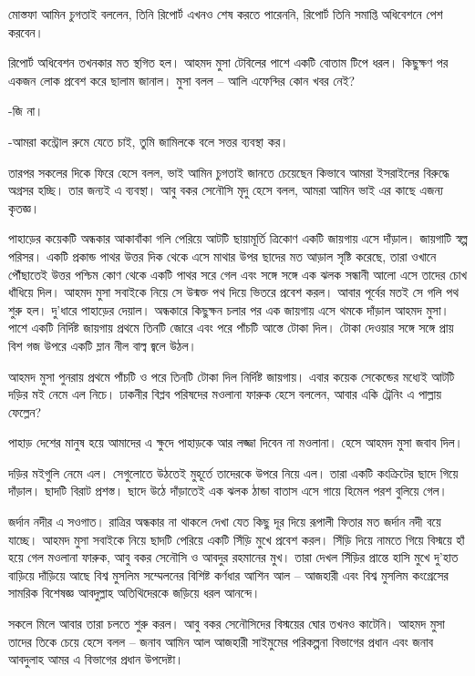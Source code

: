 \documentclass[
]{book}
\begin{document}
মোস্তফা আমিন চুগতাই বললেন, তিনি রিপোর্ট এখনও শেষ করতে পারেননি, রিপোর্ট তিনি সমাপ্তি অধিবেশনে পেশ করবেন।

রিপোর্ট অধিবেশন তখনকার মত স্থগিত হল। আহমদ মুসা টেবিলের পাশে একটি বোতাম টিপে ধরল। কিছুক্ষণ পর একজন লোক প্রবেশ করে ছালাম জানাল। মুসা বলল -- আলি এফেন্দির কোন খবর নেই?

-জি না।

-আমরা কন্ট্রোল রুমে যেতে চাই, তুমি জামিলকে বলে সত্তর ব্যবস্থা কর।

তারপর সকলের দিকে ফিরে হেসে বলল, ভাই আমিন চুগতাই জানতে চেয়েছেন কিভাবে আমরা ইসরাইলের বিরুদ্ধে অগ্রসর হচ্ছি। তার জন্যই এ ব্যবস্থা। আবু বকর সেনৌসি মৃদু হেসে বলল, আমরা আমিন ভাই এর কাছে এজন্য কৃতজ্ঞ।

পাহাড়ের কয়েকটি অন্ধকার আকাবাঁকা গলি পেরিয়ে আটটি ছায়ামূর্তি ত্রিকোণ একটি জায়গায় এসে দাঁড়াল। জায়গাটি স্বল্প পরিসর। একটি প্রকান্ড পাথর উত্তর দিক থেকে এসে মাথার উপর ছাদের মত আড়াল সৃষ্টি করেছে, তারা ওখানে পৌঁছাতেই উত্তর পশ্চিম কোণ থেকে একটি পাথর সরে গেল এবং সঙ্গে সঙ্গে এক ঝলক সন্ধানী আলো এসে তাদের চোখ ধাঁধিয়ে দিল। আহমদ মুসা সবাইকে নিয়ে সে উন্মক্ত পথ দিয়ে ভিতরে প্রবেশ করল। আবার পূর্বের মতই সে গলি পথ শুরু হল। দু'ধারে পাহাড়ের দেয়াল। অন্ধকারে কিছুক্ষন চলার পর এক জায়গায় এসে থমকে দাঁড়াল আহমদ মুসা। পাশে একটি নির্দিষ্ট জায়গায় প্রথমে তিনটি জোরে এবং পরে পাঁচটি আস্তে টোকা দিল। টোকা দেওয়ার সঙ্গে সঙ্গে প্রায় বিশ গজ উপরে একটি ম্লান নীল বাল্ব জ্বলে উঠল।

আহমদ মুসা পুনরায় প্রথমে পাঁচটি ও পরে তিনটি টোকা দিল নির্দিষ্ট জায়গায়। এবার কয়েক সেকেন্ডের মধ্যেই আটটি দড়ির মই নেমে এল নিচে। ঢাকনীর বিপ্লব পরিষদের মওলানা ফারুক হেসে বললেন, আবার একি ট্রেনিং এ পাল্লায় ফেল্লেন?

পাহাড় দেশের মানুষ হয়ে আমাদের এ ক্ষুদে পাহাড়কে আর লজ্জা দিবেন না মওলানা। হেসে আহমদ মুসা জবাব দিল।

দড়ির মইগুলি নেমে এল। সেগুলোতে উঠতেই মুহূর্তে তাদেরকে উপরে নিয়ে এল। তারা একটি কংক্রিটের ছাদে গিয়ে দাঁড়াল। ছাদটি বিরাট প্রশস্ত। ছাদে উঠে দাঁড়াতেই এক ঝলক ঠান্ডা বাতাস এসে গায়ে হিমেল পরশ বুলিয়ে গেল।

জর্দান নদীর এ সওগাত। রাত্রির অন্ধকার না থাকলে দেখা যেত কিছু দূর দিয়ে রূপালী ফিতার মত জর্দান নদী বয়ে যাচ্ছে। আহমদ মুসা সবাইকে নিয়ে ছাদটি পেরিয়ে একটি সিঁড়ি মুখে প্রবেশ করল। সিঁড়ি দিয়ে নামতে গিয়ে বিস্ময়ে হাঁ হয়ে গেল মওলানা ফারুক, আবু বকর সেনৌসি ও আবদুর রহমানের মুখ। তারা দেখল সিঁড়ির প্রান্তে হাসি মুখে দু'হাত বাড়িয়ে দাঁড়িয়ে আছে বিশ্ব মুসলিম সম্মেলনের বিশিষ্ট কর্ণধার আশিন আল -- আজহারী এবং বিশ্ব মুসলিম কংগ্রেসের সামরিক বিশেষজ্ঞ আবদুল্লাহ অতিথিদেরকে জড়িয়ে ধরল আনন্দে।

সকলে মিলে আবার তারা চলতে শুরু করল। আবু বকর সেনৌসিদের বিস্ময়ের ঘোর তখনও কাটেনি। আহমদ মুসা তাদের তিকে চেয়ে হেসে বলল -- জনাব আমিন আল আজহারী সাইমুমের পরিকল্পনা বিভাগের প্রধান এবং জনাব আবদুলাহ আমর এ বিভাগের প্রধান উপদেষ্টা।
\end{document}
